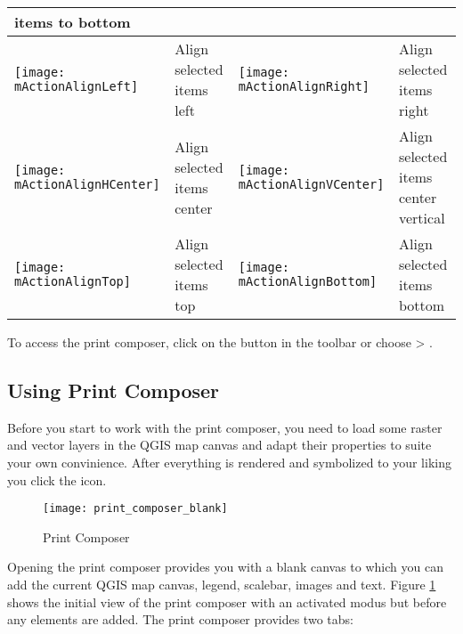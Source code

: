 \begin{table}[h]
\begin{tabular}{|l|p{6.9cm}|l|p{6.9cm}|}
 items to bottom \\
 \hline \texttt{[image: mActionAlignLeft]} & Align selected 
 items left &
 \texttt{[image: mActionAlignRight]} & Align selected items 
 right \\
 \hline \texttt{[image: mActionAlignHCenter]} & Align selected 
 items center &
 \texttt{[image: mActionAlignVCenter]} & Align selected items
 center vertical \\
 \hline \texttt{[image: mActionAlignTop]} & Align selected
 items top &
 \texttt{[image: mActionAlignBottom]} & Align selected
 items bottom \\
\hline
\end{tabular}
\end{table}

To access the print composer, click on the 
button in the toolbar or choose  > .

\subsection{Using Print Composer}\label{label_useprintcomposer} 

Before you start to work with the print composer, you need to load some 
raster and vector layers in the QGIS map canvas and adapt their properties 
to suite your own convinience. After everything is rendered and symbolized to 
your liking you click the  icon.

\begin{figure}[ht]
   \begin{center}
   \caption{Print Composer \nixcaption}\label{fig:print_composer_blank}\smallskip
   \texttt{[image: print\_composer\_blank]}
\end{center}  
\end{figure}

Opening the print composer provides you with a blank canvas to which you can 
add the current QGIS map canvas, legend, scalebar, images and text. Figure
\ref{fig:print_composer_blank} shows the initial view of the print composer 
with an activated  modus but before any elements are
added. The print composer provides two tabs:

